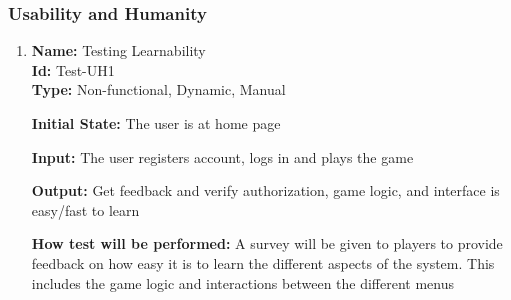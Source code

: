 \documentclass[12pt, titlepage]{article}
\begin{document}
\subsubsection{Usability and Humanity}
\begin{enumerate}
    \item{\textbf{Name: }Testing Learnability\\}\label{Test-UH1}
    \textbf{Id: }Test-UH1\\


    \textbf{Type: }Non-functional, Dynamic, Manual
    					
    \textbf{Initial State:} The user is at home page
    					
   \textbf{Input: }The user registers account, logs in and plays the game
    					
   \textbf{Output:} Get feedback and verify authorization, game logic, and interface is easy/fast to learn
    					
    \textbf{How test will be performed: }A survey will be given to players to provide feedback on how easy it is to learn the different aspects of the system. This includes the game logic and interactions between the different menus
\end{enumerate}
\end{document}
